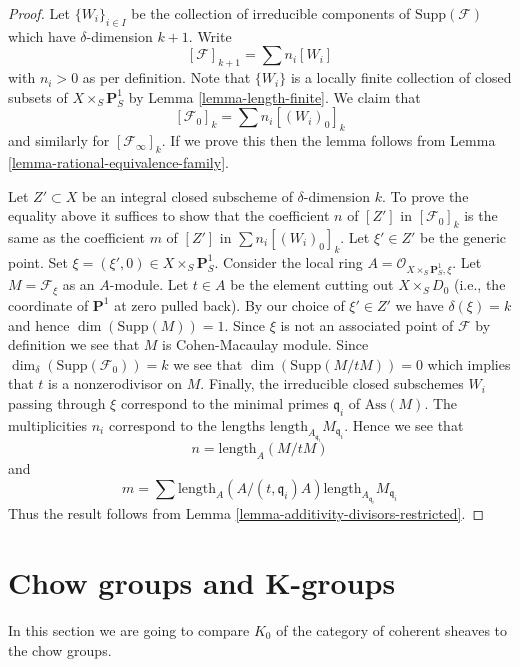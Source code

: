 \begin{proof}
Let $\{W_i\}_{i \in I}$ be the collection of irreducible
components of $\text{Supp}(\mathcal{F})$
which have $\delta$-dimension $k + 1$.
Write
$$
[\mathcal{F}]_{k + 1} = \sum n_i[W_i]
$$
with $n_i > 0$ as per definition. Note that $\{W_i\}$
is a locally finite collection of closed subsets of
$X \times_S \mathbf{P}^1_S$ by Lemma \ref{lemma-length-finite}.
We claim that
$$
[\mathcal{F}_0]_k = \sum n_i[(W_i)_0]_k
$$
and similarly for $[\mathcal{F}_\infty]_k$. If we prove this then the lemma
follows from Lemma \ref{lemma-rational-equivalence-family}.

\medskip\noindent
Let $Z' \subset X$ be an integral closed subscheme of $\delta$-dimension $k$.
To prove the equality above it suffices to show that the coefficient $n$
of $[Z']$ in $[\mathcal{F}_0]_k$ is the same as the coefficient $m$ of
$[Z']$ in $\sum n_i[(W_i)_0]_k$. Let $\xi' \in Z'$ be the generic point.
Set $\xi = (\xi', 0) \in  X \times_S \mathbf{P}^1_S$.
Consider the local ring $A = \mathcal{O}_{X \times_S \mathbf{P}^1_S, \xi}$.
Let $M = \mathcal{F}_\xi$ as an $A$-module.
Let $t \in A$ be the element cutting out $X \times_S D_0$
(i.e., the coordinate of $\mathbf{P}^1$ at zero pulled back).
By our choice of $\xi' \in Z'$ we have $\delta(\xi) = k$
and hence $\dim(\text{Supp}(M)) = 1$. Since $\xi$ is not an associated point
of $\mathcal{F}$ by definition we see that $M$ is Cohen-Macaulay module.
Since $\dim_\delta(\text{Supp}(\mathcal{F}_0)) = k$
we see that $\dim(\text{Supp}(M/tM)) = 0$ which implies that $t$
is a nonzerodivisor on $M$. Finally, the irreducible closed subschemes
$W_i$ passing through $\xi$ correspond to the minimal primes
$\mathfrak q_i$ of $\text{Ass}(M)$. The multiplicities $n_i$ correspond
to the lengths $\text{length}_{A_{\mathfrak q_i}}M_{\mathfrak q_i}$.
Hence we see that
$$
n = \text{length}_A(M/tM)
$$
and
$$
m = \sum
\text{length}_A(A/(t, \mathfrak q_i)A)
\text{length}_{A_{\mathfrak q_i}}M_{\mathfrak q_i}
$$
Thus the result follows from
Lemma \ref{lemma-additivity-divisors-restricted}.
\end{proof}








\section{Chow groups and K-groups}
\label{section-chow-and-K}

\noindent
In this section we are going to compare $K_0$ of the
category of coherent sheaves to the chow groups.


